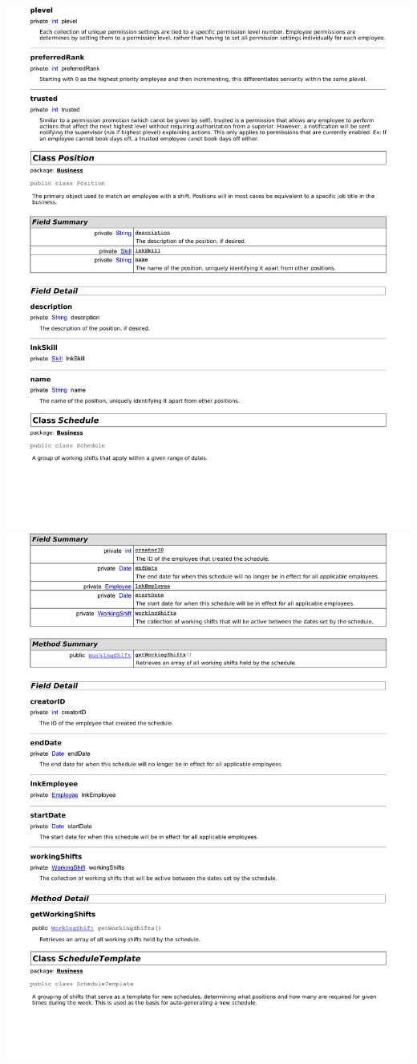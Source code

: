 \documentclass[letterpaper,12pt]{report}
\begin{document}
\newpage
\includegraphics[scale=0.9,trim=20mm 30mm 25mm 0mm]{externals/db8.pdf}
\newpage
\includegraphics[scale=0.9,trim=20mm 30mm 25mm 0mm]{externals/db9.pdf}
\end{document}
